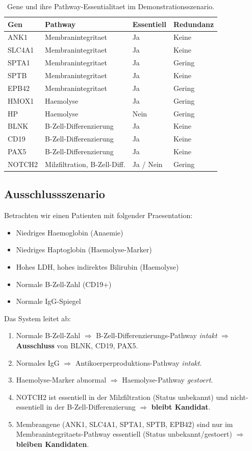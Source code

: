 \documentclass[12pt,a4paper]{article}
\begin{document}
\begin{table}[H]
\centering
\caption{Gene und ihre Pathway-Essentialitaet im Demonstrationsszenario.}
\label{de:tab:genes}
\begin{tabular}{llll}
\toprule
\textbf{Gen} & \textbf{Pathway} & \textbf{Essentiell} & \textbf{Redundanz} \\
\midrule
ANK1 & Membranintegritaet & Ja & Keine \\
SLC4A1 & Membranintegritaet & Ja & Keine \\
SPTA1 & Membranintegritaet & Ja & Gering \\
SPTB & Membranintegritaet & Ja & Keine \\
EPB42 & Membranintegritaet & Ja & Gering \\
HMOX1 & Haemolyse & Ja & Gering \\
HP & Haemolyse & Nein & Gering \\
BLNK & B-Zell-Differenzierung & Ja & Keine \\
CD19 & B-Zell-Differenzierung & Ja & Keine \\
PAX5 & B-Zell-Differenzierung & Ja & Keine \\
NOTCH2 & Milzfiltration, B-Zell-Diff. & Ja / Nein & Gering \\
\bottomrule
\end{tabular}
\end{table}

\subsection*{Ausschlussszenario}

Betrachten wir einen Patienten mit folgender Praesentation:
\begin{itemize}
    \item Niedriges Haemoglobin (Anaemie)
    \item Niedriges Haptoglobin (Haemolyse-Marker)
    \item Hohes LDH, hohes indirektes Bilirubin (Haemolyse)
    \item Normale B-Zell-Zahl (CD19+)
    \item Normale IgG-Spiegel
\end{itemize}

Das System leitet ab:
\begin{enumerate}
    \item Normale B-Zell-Zahl $\Rightarrow$ B-Zell-Differenzierungs-Pathway \emph{intakt} $\Rightarrow$ \textbf{Ausschluss} von BLNK, CD19, PAX5.
    \item Normales IgG $\Rightarrow$ Antikoerperproduktions-Pathway \emph{intakt}.
    \item Haemolyse-Marker abnormal $\Rightarrow$ Haemolyse-Pathway \emph{gestoert}.
    \item NOTCH2 ist essentiell in der Milzfiltration (Status unbekannt) und nicht-essentiell in der B-Zell-Differenzierung $\Rightarrow$ \textbf{bleibt Kandidat}.
    \item Membrangene (ANK1, SLC4A1, SPTA1, SPTB, EPB42) sind nur im Membranintegritaets-Pathway essentiell (Status unbekannt/gestoert) $\Rightarrow$ \textbf{bleiben Kandidaten}.
\end{enumerate}
\end{document}
